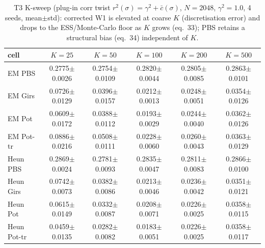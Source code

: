 \begin{table}[ht]
\centering
\caption{T3 K-sweep (plug-in corr twist $r^2(\sigma)=\gamma^2+\bar c(\sigma)$, $N=2048$, $\gamma^2=1.0$, 4 seeds, mean$\pm$std): corrected W1 is elevated at coarse $K$ (discretisation error) and drops to the ESS/Monte-Carlo floor as $K$ grows (eq.~33); PBS retains a structural bias (eq.~34) independent of $K$.}
\label{tab:toy_t3_k}
\begin{tabular}{lccccc}
\toprule
cell & $K=25$ & $K=50$ & $K=100$ & $K=200$ & $K=500$ \\
\midrule
EM PBS & 0.2775$\pm$0.0026 & 0.2754$\pm$0.0109 & 0.2820$\pm$0.0044 & 0.2805$\pm$0.0085 & 0.2863$\pm$0.0101 \\
EM Girs & 0.0726$\pm$0.0129 & 0.0396$\pm$0.0157 & 0.0212$\pm$0.0013 & 0.0248$\pm$0.0051 & 0.0354$\pm$0.0126 \\
EM Pot & 0.0609$\pm$0.0172 & 0.0388$\pm$0.0112 & 0.0193$\pm$0.0029 & 0.0244$\pm$0.0040 & 0.0362$\pm$0.0126 \\
EM Pot-tr & 0.0886$\pm$0.0216 & 0.0508$\pm$0.0111 & 0.0228$\pm$0.0060 & 0.0260$\pm$0.0043 & 0.0363$\pm$0.0129 \\
Heun PBS & 0.2869$\pm$0.0024 & 0.2781$\pm$0.0093 & 0.2835$\pm$0.0047 & 0.2811$\pm$0.0083 & 0.2866$\pm$0.0100 \\
Heun Girs & 0.0742$\pm$0.0073 & 0.0382$\pm$0.0086 & 0.0213$\pm$0.0046 & 0.0236$\pm$0.0042 & 0.0351$\pm$0.0121 \\
Heun Pot & 0.0615$\pm$0.0149 & 0.0332$\pm$0.0087 & 0.0208$\pm$0.0071 & 0.0226$\pm$0.0025 & 0.0358$\pm$0.0115 \\
Heun Pot-tr & 0.0459$\pm$0.0135 & 0.0282$\pm$0.0082 & 0.0183$\pm$0.0051 & 0.0226$\pm$0.0025 & 0.0358$\pm$0.0117 \\
\bottomrule
\end{tabular}
\end{table}
